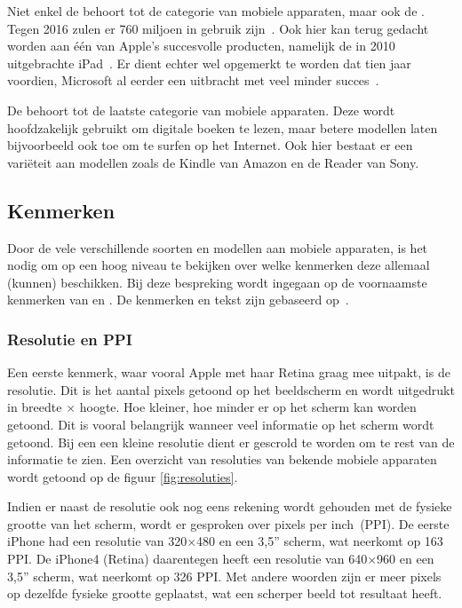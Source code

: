 Niet enkel de  behoort tot de categorie van mobiele apparaten, maar ook de . 
Tegen 2016 zulen er 760 miljoen  in gebruik zijn~\cite{Gillett2012}.
Ook hier kan terug gedacht worden aan één van Apple's succesvolle producten, namelijk de in 2010 uitgebrachte iPad~\cite{Apple2010}. 
Er dient echter wel opgemerkt te worden dat tien jaar voordien, Microsoft al eerder een  uitbracht met veel minder succes~\cite{Microsoft2000}.

De  behoort tot de laatste categorie van mobiele apparaten. 
Deze wordt hoofdzakelijk gebruikt om digitale boeken te lezen, maar betere modellen laten bijvoorbeeld ook toe om te surfen op het Internet. 
Ook hier bestaat er een variëteit aan modellen zoals de Kindle van Amazon en de Reader van Sony.

\subsection{Kenmerken}
Door de vele verschillende soorten en modellen aan mobiele apparaten, is het nodig om op een hoog niveau te bekijken over welke kenmerken deze allemaal (kunnen) beschikken. 
Bij deze bespreking wordt ingegaan op de voornaamste kenmerken van  en . De kenmerken en tekst zijn gebaseerd op~\cite{PhilDutson2012}.

\subsubsection{Resolutie en PPI}
Een eerste kenmerk, waar vooral Apple met haar Retina graag mee uitpakt, is de resolutie. 
Dit is het aantal pixels getoond op het beeldscherm en wordt uitgedrukt in breedte $\times$ hoogte. 
Hoe kleiner, hoe minder er op het scherm kan worden getoond. 
Dit is vooral belangrijk wanneer veel informatie op het scherm wordt getoond. 
Bij een een kleine resolutie dient er gescrold te worden om te rest van de informatie te zien.
Een overzicht van resoluties van bekende mobiele apparaten wordt getoond op de figuur \ref{fig:resoluties}.

Indien er naast de resolutie ook nog eens rekening wordt gehouden met de fysieke grootte van het scherm, wordt er gesproken over pixels per inch~(PPI). 
De eerste iPhone had een resolutie van 320$\times$480 en een 3,5” scherm, wat neerkomt op 163 PPI. 
De iPhone4 (Retina) daarentegen heeft een resolutie van 640$\times$960 en een 3,5” scherm, wat neerkomt op 326 PPI. 
Met andere woorden zijn er meer pixels op dezelfde fysieke grootte geplaatst, wat een scherper beeld tot resultaat heeft. 

